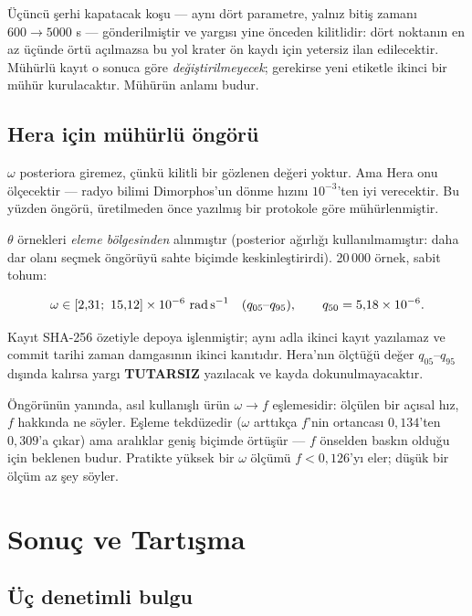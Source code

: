 \documentclass[12pt,a4paper]{article}
\begin{document}
Üçüncü şerhi kapatacak koşu --- aynı dört parametre, yalnız bitiş
zamanı $600 \to 5000$ s --- gönderilmiştir ve yargısı yine önceden
kilitlidir: dört noktanın en az üçünde örtü açılmazsa bu yol krater
ön kaydı için yetersiz ilan edilecektir. Mühürlü kayıt o sonuca göre
\emph{değiştirilmeyecek}; gerekirse yeni etiketle ikinci bir mühür
kurulacaktır. Mühürün anlamı budur.

\subsection{Hera için mühürlü öngörü}

$\omega$ posteriora giremez, çünkü kilitli bir gözlenen değeri yoktur.
Ama Hera onu ölçecektir --- radyo bilimi Dimorphos'un dönme hızını
$10^{-3}$'ten iyi verecektir. Bu yüzden öngörü, üretilmeden önce
yazılmış bir protokole göre mühürlenmiştir.

$\theta$ örnekleri \emph{eleme bölgesinden} alınmıştır (posterior
ağırlığı kullanılmamıştır: daha dar olanı seçmek öngörüyü sahte
biçimde keskinleştirirdi). 20\,000 örnek, sabit tohum:

\begin{equation}
\omega \in [2{,}31;\ 15{,}12] \times 10^{-6}\ \text{rad\,s}^{-1}
\quad (q_{05}\text{--}q_{95}), \qquad
q_{50} = 5{,}18 \times 10^{-6} .
\label{esit:spinongoru}
\end{equation}

Kayıt SHA-256 özetiyle depoya işlenmiştir; aynı adla ikinci kayıt
yazılamaz ve commit tarihi zaman damgasının ikinci kanıtıdır. Hera'nın
ölçtüğü değer $q_{05}$--$q_{95}$ dışında kalırsa yargı
\textbf{TUTARSIZ} yazılacak ve kayda dokunulmayacaktır.

Öngörünün yanında, asıl kullanışlı ürün $\omega \to f$ eşlemesidir:
ölçülen bir açısal hız, $f$ hakkında ne söyler. Eşleme tekdüzedir
($\omega$ arttıkça $f$'nin ortancası $0{,}134$'ten $0{,}309$'a çıkar)
ama aralıklar geniş biçimde örtüşür --- $f$ önselden baskın olduğu için
beklenen budur. Pratikte yüksek bir $\omega$ ölçümü $f<0{,}126$'yı
eler; düşük bir ölçüm az şey söyler.

\section{Sonuç ve Tartışma}

\subsection{Üç denetimli bulgu}
\end{document}
